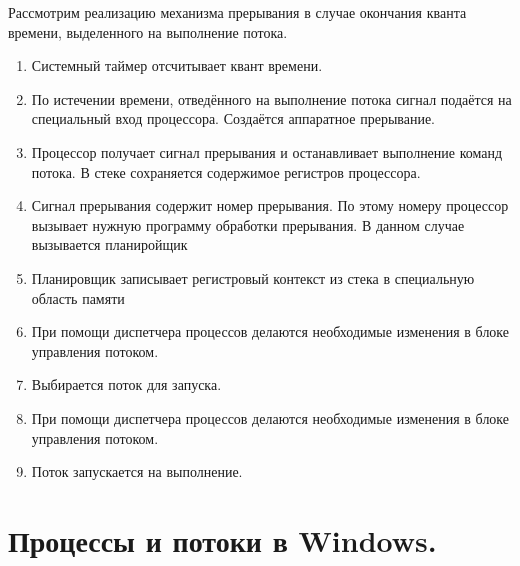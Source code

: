 \documentclass[a4paper]{article}
\begin{document}
Рассмотрим реализацию механизма прерывания в случае окончания кванта времени, выделенного на выполнение потока.
\begin{enumerate}
        \item Системный таймер отсчитывает квант времени.
	\item По истечении времени, отведённого на выполнение потока сигнал подаётся на специальный вход процессора. Создаётся аппаратное прерывание.
	\item Процессор получает сигнал прерывания и останавливает выполнение команд потока. В стеке сохраняется содержимое регистров процессора.
	\item Сигнал прерывания содержит номер прерывания. По этому номеру процессор вызывает нужную программу обработки прерывания. В данном случае вызывается планиройщик
	\item  Планировщик записывает регистровый контекст из стека в специальную область памяти
	\item При помощи диспетчера процессов делаются необходимые изменения в блоке управления потоком.
	\item Выбирается поток для запуска.
	\item При помощи диспетчера процессов делаются необходимые изменения в блоке управления потоком.
	\item Поток запускается на выполнение.
\end{enumerate}
\section{Процессы и потоки в Windows.}
\setcounter{subsection}{0}
\end{document}

